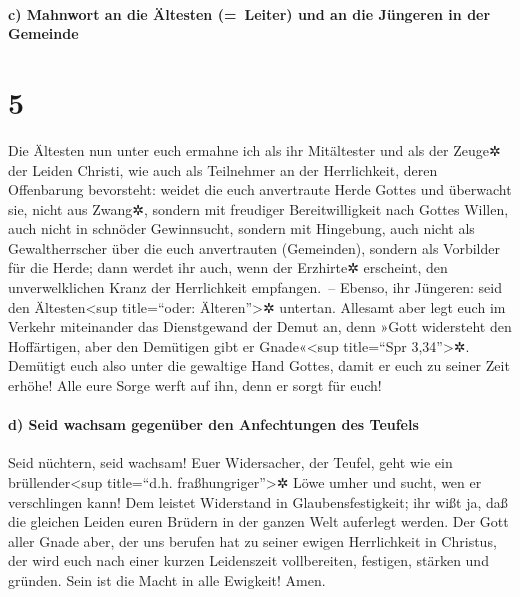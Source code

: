 \hypertarget{c-mahnwort-an-die-uxe4ltesten-leiter-und-an-die-juxfcngeren-in-der-gemeinde}{%
\paragraph{c) Mahnwort an die Ältesten (=~Leiter) und an die Jüngeren in
der
Gemeinde}\label{c-mahnwort-an-die-uxe4ltesten-leiter-und-an-die-juxfcngeren-in-der-gemeinde}}

\hypertarget{section-4}{%
\section{5}\label{section-4}}

 Die Ältesten nun unter euch ermahne ich als ihr
Mitältester und als der Zeuge✲ der Leiden Christi, wie auch als
Teilnehmer an der Herrlichkeit, deren Offenbarung bevorsteht:
 weidet die euch anvertraute Herde Gottes und überwacht
sie, nicht aus Zwang✲, sondern mit freudiger Bereitwilligkeit nach
Gottes Willen, auch nicht in schnöder Gewinnsucht, sondern mit
Hingebung,  auch nicht als Gewaltherrscher über die euch
anvertrauten (Gemeinden), sondern als Vorbilder für die Herde;
 dann werdet ihr auch, wenn der Erzhirte✲ erscheint, den
unverwelklichen Kranz der Herrlichkeit empfangen.~-- 
Ebenso, ihr Jüngeren: seid den Ältesten\textless sup title=``oder:
Älteren''\textgreater✲ untertan. Allesamt aber legt euch im Verkehr
miteinander das Dienstgewand der Demut an, denn »Gott widersteht den
Hoffärtigen, aber den Demütigen gibt er Gnade«\textless sup title=``Spr
3,34''\textgreater✲.  Demütigt euch also unter die
gewaltige Hand Gottes, damit er euch zu seiner Zeit erhöhe!
 Alle eure Sorge werft auf ihn, denn er sorgt für euch!

\hypertarget{d-seid-wachsam-gegenuxfcber-den-anfechtungen-des-teufels}{%
\paragraph{d) Seid wachsam gegenüber den Anfechtungen des
Teufels}\label{d-seid-wachsam-gegenuxfcber-den-anfechtungen-des-teufels}}

 Seid nüchtern, seid wachsam! Euer Widersacher, der
Teufel, geht wie ein brüllender\textless sup title=``d.h.
fraßhungriger''\textgreater✲ Löwe umher und sucht, wen er verschlingen
kann!  Dem leistet Widerstand in Glaubensfestigkeit; ihr
wißt ja, daß die gleichen Leiden euren Brüdern in der ganzen Welt
auferlegt werden.  Der Gott aller Gnade aber, der uns
berufen hat zu seiner ewigen Herrlichkeit in Christus, der wird euch
nach einer kurzen Leidenszeit vollbereiten, festigen, stärken und
gründen.  Sein ist die Macht in alle Ewigkeit! Amen.


